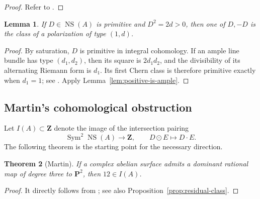 \documentclass[12pt]{amsart}
\numberwithin{equation}{section}
\newtheorem{theorem}{Theorem}[section]
\newtheorem{lemma}[theorem]{Lemma}
\theoremstyle{definition}
\theoremstyle{remark}
\newcommand{\Z}{\mathbf Z}
\newcommand{\PP}{\mathbf P}
\newcommand{\NS}{\operatorname{NS}}
\newcommand{\irr}{\operatorname{irr}}
\newcommand{\Sym}{\operatorname{Sym}}
\begin{document}
\begin{proof}
Refer to \cite[Corollary~4.3.3]{BL}.
\end{proof}

\begin{lemma}\label{lem:primitive-type}
If $D\in\NS(A)$ is primitive and $D^2=2d>0$, then one of $D,-D$ is the
class of a polarization of type $(1,d)$.
\end{lemma}

\begin{proof}
By saturation, $D$ is primitive in integral cohomology.  If an ample
line bundle has type $(d_1,d_2)$, then its square is $2d_1d_2$, and the
divisibility of its alternating Riemann form is $d_1$.  Its first Chern
class is therefore primitive exactly when $d_1=1$; see
\cite[Section~3.1 and Lemma~3.6.4]{BL}.  Apply
Lemma~\ref{lem:positive-is-ample}.
\end{proof}



\subsection{Martin's cohomological obstruction}
\label{subsec:martin-obstruction}

Let $I(A)\subset\Z$ denote the image of the intersection pairing
\[
                 \Sym^2\NS(A)\longrightarrow\Z,
                 \qquad D\odot E\longmapsto D\cdot E.
\]
The following theorem is the starting point for the necessary direction.

\begin{theorem}[Martin]\label{thm:martin}
If a complex abelian surface admits a dominant rational map of degree
three to $\PP^2$, then $12\in I(A)$.
\end{theorem}

\begin{proof}
It directly follows from \cite[Theorem~1.1]{Martin}; see also Proposition~\ref{prop:residual-class}.
\end{proof}
\end{document}
